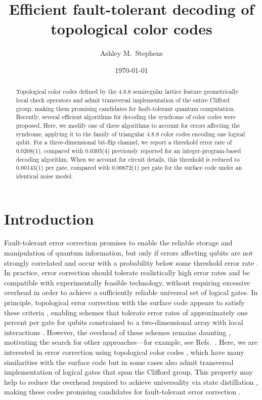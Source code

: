 \documentclass[letterpaper,showpacs,superscriptaddress,twocolumn,aps,prl]{revtex4-1}
\begin{document}
\title{Efficient fault-tolerant decoding of topological color codes}
\author{Ashley M.~Stephens}

\date{\today}
\begin{abstract}
Topological color codes defined by the 4.8.8 semiregular lattice feature geometrically local check operators and admit transversal implementation of the entire Clifford group, making them promising candidates for fault-tolerant quantum computation. Recently, several efficient algorithms for decoding the syndrome of color codes were proposed. Here, we modify one of these algorithms to account for errors affecting the syndrome, applying it to the family of triangular 4.8.8 color codes encoding one logical qubit. For a three-dimensional bit-flip channel, we report a threshold error rate of 0.0208(1), compared with 0.0305(4) previously reported for an integer-program-based decoding algorithm. When we account for circuit details, this threshold is reduced to 0.00143(1) per gate, compared with 0.00672(1) per gate for the surface code under an identical noise model.
\end{abstract}

\maketitle
\section{Introduction}
Fault-tolerant error correction promises to enable the reliable storage and manipulation of quantum information, but only if errors affecting qubits are not strongly correlated and occur with a probability below some threshold error rate \cite{Aliferis06,Gottesman1}. In practice, error correction should tolerate realistically high error rates and be compatible with experimentally feasible technology, without requiring excessive overhead in order to achieve a sufficiently reliable universal set of logical gates. In principle, topological error correction with the surface code appears to satisfy these criteria \cite{Kitaev2003,Bravyi2,Freedman1,Dennis2002}, enabling schemes that tolerate error rates of approximately one percent per gate for qubits constrained to a two-dimensional array with local interactions \cite{Raussendorf3,Raussendorf2007,Fowler1,Stephens13a}. However, the overhead of these schemes remains daunting \cite{Martinis2012,Devitt}, motivating the search for other approaches---for example, see Refs.~\cite{Bravyi12,Paetznick13,Jochym13,Gottesman13}. Here, we are interested in error correction using topological color codes \cite{Bombin1,Bombin2}, which have many similarities with the surface code but in some cases also admit transversal implementation of logical gates that span the Clifford group. This property may help to reduce the overhead required to achieve universality via state distillation \cite{BK05}, making these codes promising candidates for fault-tolerant error correction \cite{Landahl1,Fowler11}.
\end{document}
